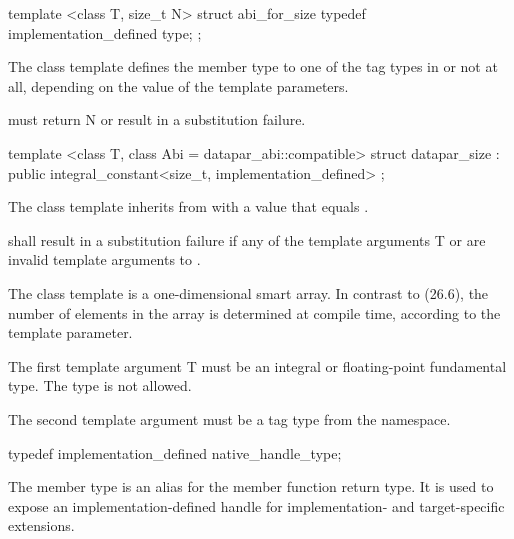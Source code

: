 \begin{wgText}
  \begin{itemdecl}
template <class T, size_t N> struct abi_for_size { typedef implementation_defined type; };
  \end{itemdecl}
  \begin{itemdescr}
    \pnum
    The  class template defines the member type  to one of the tag types in  or not at all, depending on the value of the template parameters.

    \pnum
     must return \code N or result in a substitution failure.
  \end{itemdescr}

  \begin{itemdecl}
template <class T, class Abi = datapar_abi::compatible>
struct datapar_size : public integral_constant<size_t, implementation_defined> {};
  \end{itemdecl}
  \begin{itemdescr}
    \pnum The  class template inherits from  with a value that equals \datapar{}.

    \pnum {} shall result in a substitution failure if any of the template arguments \type T or  are invalid template arguments to \datapar.
  \end{itemdescr}

  

  \pnum The class template \datapar{} is a one-dimensional smart array.
  In contrast to  (26.6), the number of elements in the array is determined at compile time, according to the  template parameter.

  \pnum The first template argument \type T must be an integral or floating-point fundamental type.
  The type \bool is not allowed.

  \pnum The second template argument  must be a tag type from the  namespace.

  \begin{itemdecl}
typedef implementation_defined native_handle_type;
  \end{itemdecl}
  \begin{itemdescr}
    \pnum
    The  member type is an alias for the  member function return type.
    It is used to expose an implementation-defined handle for implementation- and target-specific extensions.
  \end{itemdescr}


\end{wgText}

